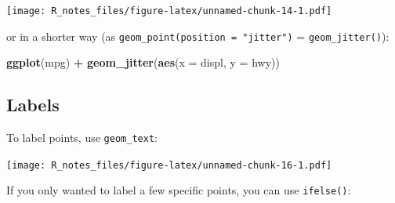 \documentclass[]{book}
\newenvironment{Shaded}{\begin{snugshade}}{\end{snugshade}}
\newcommand{\KeywordTok}[1]{\textcolor[rgb]{0.13,0.29,0.53}{\textbf{#1}}}
\newcommand{\DataTypeTok}[1]{\textcolor[rgb]{0.13,0.29,0.53}{#1}}
\newcommand{\DecValTok}[1]{\textcolor[rgb]{0.00,0.00,0.81}{#1}}
\newcommand{\FloatTok}[1]{\textcolor[rgb]{0.00,0.00,0.81}{#1}}
\newcommand{\StringTok}[1]{\textcolor[rgb]{0.31,0.60,0.02}{#1}}
\newcommand{\OperatorTok}[1]{\textcolor[rgb]{0.81,0.36,0.00}{\textbf{#1}}}
\newcommand{\NormalTok}[1]{#1}
\begin{document}
\texttt{[image: R\_notes\_files/figure-latex/unnamed-chunk-14-1.pdf]}

or in a shorter way (as \texttt{geom\_point(position\ =\ "jitter")} =
\texttt{geom\_jitter()}):

\begin{Shaded}
\begin{Highlighting}[]
\KeywordTok{ggplot}\NormalTok{(mpg) }\OperatorTok{+}\StringTok{ }
\StringTok{  }\KeywordTok{geom_jitter}\NormalTok{(}\KeywordTok{aes}\NormalTok{(}\DataTypeTok{x =}\NormalTok{ displ, }\DataTypeTok{y =}\NormalTok{ hwy))}
\end{Highlighting}
\end{Shaded}

\subsection{Labels}\label{labels}

To label points, use \texttt{geom\_text}:

\begin{Shaded}
\end{Shaded}

\texttt{[image: R\_notes\_files/figure-latex/unnamed-chunk-16-1.pdf]}

If you only wanted to label a few specific points, you can use
\texttt{ifelse()}:

\begin{Shaded}
\end{Shaded}
\end{document}
